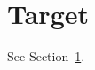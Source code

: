 \documentclass{article}
\begin{document}
\section{Target}\label{sec:target}
See Section~\ref{sec:target}.
\end{document}
